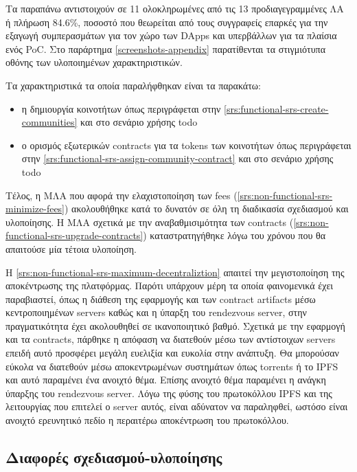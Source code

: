 Τα παραπάνω αντιστοιχούν σε 11 ολοκληρωμένες από τις 13 προδιαγεγραμμένες ΛΑ ή πλήρωση 84.6\%, ποσοστό που θεωρείται από τους συγγραφείς επαρκές για την εξαγωγή συμπερασμάτων για τον χώρο των DApps και υπερβάλλων για τα πλαίσια ενός PoC. Στο παράρτημα \ref{screenshots-appendix} παρατίθενται τα στιγμιότυπα οθόνης των υλοποιημένων χαρακτηριστικών.

Τα χαρακτηριστικά τα οποία παραλήφθηκαν είναι τα παρακάτω:

\begin{itemize}
    \item η δημιουργία κοινοτήτων όπως περιγράφεται στην \ref{srs:functional-srs-create-communities} και στο σενάριο χρήσης todo
    \item ο ορισμός εξωτερικών contracts για τα tokens των κοινοτήτων όπως περιγράφεται στην \ref{srs:functional-srs-assign-community-contract} και στο σενάριο χρήσης todo
\end{itemize}

Τέλος, η ΜΛΑ που αφορά την ελαχιστοποίηση των fees (\ref{srs:non-functional-srs-minimize-fees}) ακολουθήθηκε κατά το δυνατόν σε όλη τη διαδικασία σχεδιασμού και υλοποίησης. Η ΜΛΑ σχετικά με την αναβαθμισιμότητα των contracts (\ref{srs:non-functional-srs-upgrade-contracts}) καταστρατηγήθηκε λόγω του χρόνου που θα απαιτούσε μία τέτοια υλοποίηση.

Η \ref{srs:non-functional-srs-maximum-decentraliztion} απαιτεί την μεγιστοποίηση της αποκέντρωσης της πλατφόρμας. Παρότι υπάρχουν μέρη τα οποία φαινομενικά έχει παραβιαστεί, όπως η διάθεση της εφαρμογής και των contract artifacts μέσω κεντροποιημένων servers καθώς και η ύπαρξη του rendezvous server, στην πραγματικότητα έχει ακολουθηθεί σε ικανοποιητικό βαθμό. Σχετικά με την εφαρμογή και τα contracts, πάρθηκε η απόφαση να διατεθούν μέσω των αντίστοιχων servers επειδή αυτό προσφέρει μεγάλη ευελιξία και ευκολία στην ανάπτυξη. Θα μπορούσαν εύκολα να διατεθούν μέσω αποκεντρωμένων συστημάτων όπως torrents ή το IPFS και αυτό παραμένει ένα ανοιχτό θέμα. Επίσης ανοιχτό θέμα παραμένει η ανάγκη ύπαρξης του rendezvous server. Λόγω της φύσης του πρωτοκόλλου IPFS και της λειτουργίας που επιτελεί ο server αυτός, είναι αδύνατον να παραληφθεί, ωστόσο είναι ανοιχτό ερευνητικό πεδίο η περαιτέρω αποκέντρωση του πρωτοκόλλου.

\subsection{Διαφορές σχεδιασμού-υλοποίησης} \label{subsection:4-6-1-design-implementation-differences}

